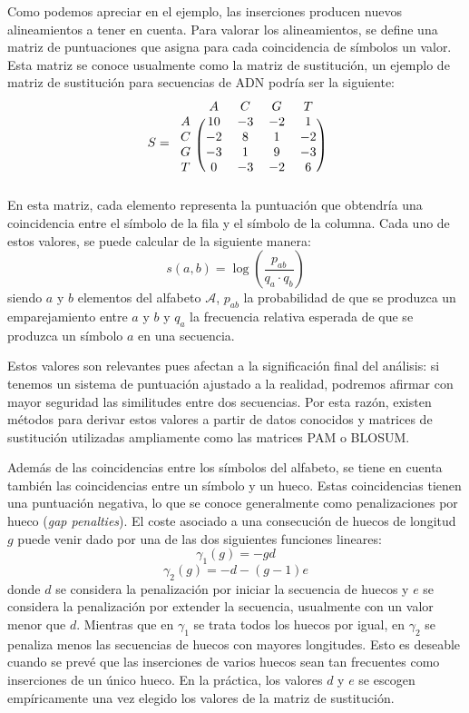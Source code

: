 Como podemos apreciar en el ejemplo, las inserciones producen nuevos alineamientos a tener en cuenta. Para valorar los alineamientos, se define una matriz de puntuaciones que asigna para cada coincidencia de símbolos un valor. Esta matriz se conoce usualmente como la matriz de sustitución, un ejemplo de matriz de sustitución para secuencias de ADN podría ser la siguiente:
\[
S=\begin{blockarray}{ccccc}
 & A & C & G & T \\
\begin{block}{c(cccc)}
  A & 10 & -3 & -2 & 1 \\
  C & -2 & 8 & 1 & -2 \\
  G & -3 & 1 & 9 & -3 \\
  T & 0 & -3 & -2 & 6\\
\end{block}
\end{blockarray}
 \]
En esta matriz, cada elemento representa la puntuación que obtendría una coincidencia entre el símbolo de la fila y el símbolo de la columna. Cada uno de estos valores, se puede calcular de la siguiente manera:
\[s(a,b)=\log\left(\dfrac{p_{ab}}{q_a\cdot q_b}\right)\]
siendo $a$ y $b$ elementos del alfabeto $\mathcal{A}$, $p_{ab}$ la probabilidad de que se produzca un emparejamiento entre $a$ y $b$ y $q_a$ la frecuencia relativa esperada de que se produzca un símbolo $a$ en una secuencia. 

Estos valores son relevantes pues afectan a la significación final del análisis: si tenemos un sistema de puntuación ajustado a la realidad, podremos afirmar con mayor seguridad las similitudes entre dos secuencias. Por esta razón, existen métodos para derivar estos valores a partir de datos conocidos y matrices de sustitución utilizadas ampliamente como las matrices PAM o BLOSUM.

Además de las coincidencias entre los símbolos del alfabeto, se tiene en cuenta también las coincidencias entre un símbolo y un hueco. Estas coincidencias tienen una puntuación negativa, lo que se conoce generalmente como penalizaciones por hueco (\textit{gap penalties}). El coste asociado a una consecución de huecos de longitud $g$ puede venir dado por una de las dos siguientes funciones lineares:
\[\gamma_1(g)=-gd \]
\[\gamma_2(g)=-d-(g-1)e\]
donde $d$ se considera la penalización por iniciar la secuencia de huecos y $e$ se considera la penalización por extender la secuencia, usualmente con un valor menor que $d$. Mientras que en $\gamma_1$ se trata todos los huecos por igual, en $\gamma_2$ se penaliza menos las secuencias de huecos con mayores longitudes. Esto es deseable cuando se prevé que las inserciones de varios huecos sean tan frecuentes como inserciones de un único hueco. En la práctica, los valores $d$ y $e$ se escogen empíricamente una vez elegido los valores de la matriz de sustitución.

